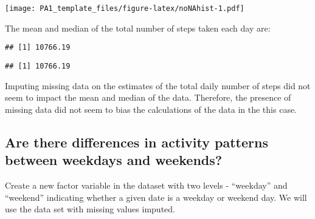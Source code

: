 \documentclass[
]{article}
\newenvironment{Shaded}{\begin{snugshade}}{\end{snugshade}}
\newcommand{\AttributeTok}[1]{\textcolor[rgb]{0.77,0.63,0.00}{#1}}
\newcommand{\FunctionTok}[1]{\textcolor[rgb]{0.00,0.00,0.00}{#1}}
\newcommand{\NormalTok}[1]{#1}
\newcommand{\OtherTok}[1]{\textcolor[rgb]{0.56,0.35,0.01}{#1}}
\newcommand{\SpecialCharTok}[1]{\textcolor[rgb]{0.00,0.00,0.00}{#1}}
\newcommand{\StringTok}[1]{\textcolor[rgb]{0.31,0.60,0.02}{#1}}
\begin{document}
\texttt{[image: PA1\_template\_files/figure-latex/noNAhist-1.pdf]}

The mean and median of the total number of steps taken each day are:

\begin{Shaded}
\end{Shaded}

\begin{verbatim}
## [1] 10766.19
\end{verbatim}

\begin{Shaded}
\end{Shaded}

\begin{verbatim}
## [1] 10766.19
\end{verbatim}

Imputing missing data on the estimates of the total daily number of
steps did not seem to impact the mean and median of the data. Therefore,
the presence of missing data did not seem to bias the calculations of
the data in the this case.

\hypertarget{are-there-differences-in-activity-patterns-between-weekdays-and-weekends}{%
\subsection{Are there differences in activity patterns between weekdays
and
weekends?}\label{are-there-differences-in-activity-patterns-between-weekdays-and-weekends}}

Create a new factor variable in the dataset with two levels -
``weekday'' and ``weekend'' indicating whether a given date is a weekday
or weekend day. We will use the data set with missing values imputed.

\begin{Shaded}
\end{Shaded}
\end{document}
